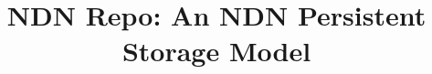 \documentclass[conference]{IEEEtran}
\begin{document}
%
\title{NDN Repo: An NDN Persistent Storage Model}



\end{document}
